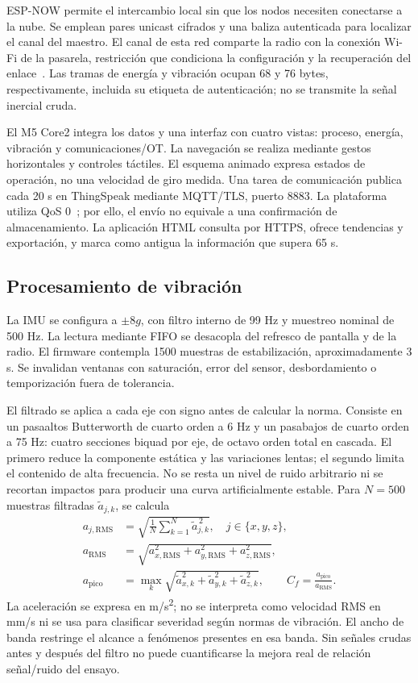 \documentclass[journal,onecolumn,11pt,a4paper]{IEEEtran}
\begin{document}
ESP-NOW permite el intercambio local sin que los nodos necesiten conectarse a la nube. Se emplean pares unicast cifrados y una baliza autenticada para localizar el canal del maestro. El canal de esta red comparte la radio con la conexión Wi-Fi de la pasarela, restricción que condiciona la configuración y la recuperación del enlace~\cite{espnow}. Las tramas de energía y vibración ocupan 68 y 76 bytes, respectivamente, incluida su etiqueta de autenticación; no se transmite la señal inercial cruda.

El M5 Core2 integra los datos y una interfaz con cuatro vistas: proceso, energía, vibración y comunicaciones/OT. La navegación se realiza mediante gestos horizontales y controles táctiles. El esquema animado expresa estados de operación, no una velocidad de giro medida. Una tarea de comunicación publica cada 20 s en ThingSpeak mediante MQTT/TLS, puerto 8883. La plataforma utiliza QoS 0~\cite{thingspeak}; por ello, el envío no equivale a una confirmación de almacenamiento. La aplicación HTML consulta por HTTPS, ofrece tendencias y exportación, y marca como antigua la información que supera 65 s.

\subsection{Procesamiento de vibración}
La IMU se configura a $\pm8g$, con filtro interno de 99 Hz y muestreo nominal de 500 Hz. La lectura mediante FIFO se desacopla del refresco de pantalla y de la radio. El firmware contempla 1500 muestras de estabilización, aproximadamente 3 s. Se invalidan ventanas con saturación, error del sensor, desbordamiento o temporización fuera de tolerancia.

El filtrado se aplica a cada eje con signo antes de calcular la norma. Consiste en un pasaaltos Butterworth de cuarto orden a 6 Hz y un pasabajos de cuarto orden a 75 Hz: cuatro secciones biquad por eje, de octavo orden total en cascada. El primero reduce la componente estática y las variaciones lentas; el segundo limita el contenido de alta frecuencia. No se resta un nivel de ruido arbitrario ni se recortan impactos para producir una curva artificialmente estable. Para $N=500$ muestras filtradas $\widetilde{a}_{j,k}$, se calcula
\begin{align}
 a_{j,\mathrm{RMS}}&=\sqrt{\frac{1}{N}\sum_{k=1}^{N}\widetilde{a}_{j,k}^{\,2}},\quad j\in\{x,y,z\},\\
 a_{\mathrm{RMS}}&=\sqrt{a_{x,\mathrm{RMS}}^2+a_{y,\mathrm{RMS}}^2+a_{z,\mathrm{RMS}}^2},\\
 a_{\mathrm{pico}}&=\max_k\sqrt{\widetilde{a}_{x,k}^2+\widetilde{a}_{y,k}^2+\widetilde{a}_{z,k}^2},\qquad
 C_f=\frac{a_{\mathrm{pico}}}{a_{\mathrm{RMS}}}.
\end{align}
La aceleración se expresa en m/s\textsuperscript{2}; no se interpreta como velocidad RMS en mm/s ni se usa para clasificar severidad según normas de vibración. El ancho de banda restringe el alcance a fenómenos presentes en esa banda. Sin señales crudas antes y después del filtro no puede cuantificarse la mejora real de relación señal/ruido del ensayo.
\end{document}
